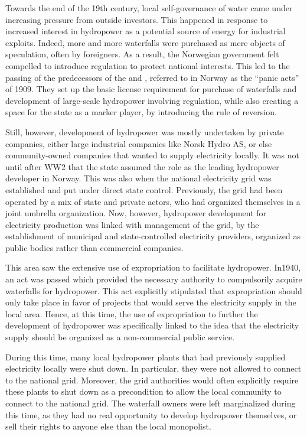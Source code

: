 Towards the end of the 19th century, local self-governance of water came under increasing pressure from outside investors. This happened in response to increased interest in hydropower as a potential source of energy for industrial exploits. Indeed, more and more waterfalls were purchased as mere objects of speculation, often by foreigners. As a result, the Norwegian government felt compelled to introduce regulation to protect national interests. This led to the passing of the predecessors of the \cite{ica17} and \cite{wra17}, referred to in Norway as the ``panic acts'' of 1909. They set up the basic license requirement for purchase of waterfalls and development of large-scale hydropower involving regulation, while also creating a space for the state as a marker player, by introducing the rule of reversion. 

Still, however, development of hydropower was mostly undertaken by private companies, either large industrial companies like Norsk Hydro AS, or else community-owned companies that wanted to supply electricity locally. It was not until after WW2 that the state assumed the role as the leading hydropower developer in Norway. This was also when the national electricity grid was established and put under direct state control. Previously, the grid had been operated by a mix of state and private actors, who had organized themselves in a joint umbrella organization. Now, however, hydropower development for electricity production was linked with management of the grid, by the establishment of municipal and state-controlled electricity providers, organized as public bodies rather than commercial companies. 

This area saw the extensive use of expropriation to facilitate hydropower. In1940, an act was passed which provided the necessary authority to compulsorily acquire waterfalls for hydropower. This act explicitly stipulated that expropriation should only take place in favor of projects that would serve the electricity supply in the local area. Hence, at this time, the use of expropriation to further the development of hydropower was specifically linked to the idea that the electricity supply should be organized as a non-commercial public service.

During this time, many local hydropower plants that had previously supplied electricity locally were shut down. In particular, they were not allowed to connect to the national grid. Moreover, the grid authorities would often explicitly require these plants to shut down as a precondition to allow the local community to connect to the national grid. The waterfall owners were left marginalized during this time, as they had no real opportunity to develop hydropower themselves, or sell their rights to anyone else than the local monopolist. 

